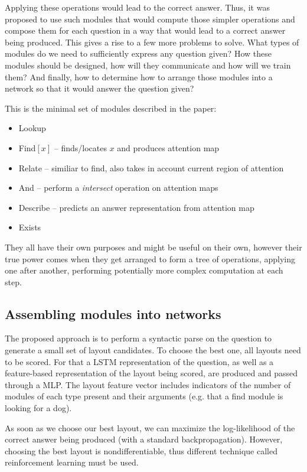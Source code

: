 \documentclass[a4paper]{article}
\begin{document}
\begin{multicols}{2}
    Applying these operations would lead to the correct answer. Thus, it was proposed to use such modules that would compute those simpler operations and compose them for each question in a way that would lead to a correct answer being produced. This gives a rise to a few more problems to solve. What types of modules do we need to sufficiently express any question given? How these modules should be designed, how will they communicate and how will we train them? And finally, how to determine how to arrange those modules into a network so that it would answer the question given?

This is the minimal set of modules described in the paper:
\begin{itemize}
    \item Lookup
    \item Find$[x]$ – finds/locates $x$ and produces attention map
    \item Relate – similiar to find, also takes in account current region of attention
    \item And – perform a \textit{intersect} operation on attention maps
    \item Describe – predicts an answer representation from attention map
    \item Exists
\end{itemize}

They all have their own purposes and might be useful on their own, however their true
power comes when they get arranged to form a tree of operations, applying one after another, performing potentially more complex computation at each step.

\subsection*{Assembling modules into networks}
    The proposed approach is to perform a syntactic parse on the question to generate a small set of layout candidates. To choose the best one, all layouts need to be scored. For that a LSTM representation of the question, as well as a feature-based representation of the layout being scored, are produced and passed through a MLP. The layout feature vector includes indicators of the number of modules of each type present and their arguments (e.g. that a find module is looking for a dog).

    As soon as we choose our best layout, we can maximize the log-likelihood of the correct answer being produced (with a standard backpropagation). However, choosing the best layout is nondifferentiable, thus different technique called reinforcement learning must be used.

\end{multicols}
\end{document}
